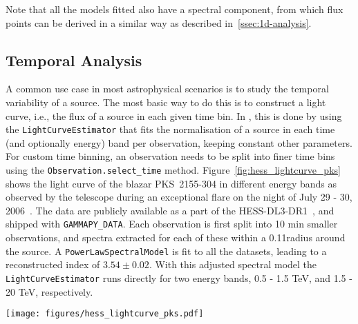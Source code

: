 \documentclass[traditabstract, longauth]{aa}
\newcommand{\todo}[1]{\textcolor{red}{TODO: #1}\PackageWarning{TODO:}{#1!}}
\newcommand{\code}[1]{\texttt{#1}}
\begin{document}
Note that all the models fitted also have a spectral component, from which flux
points can be derived in a similar way as described in~\ref{ssec:1d-analysis}.

\subsection{Temporal Analysis}
\label{ssec:temporal-analysis}
A common use case in most astrophysical scenarios is to study the temporal
variability of a source. The most basic way to do this is to construct a
light curve, i.e., the flux of a source in each given time bin. In \gammapy, this
is done by using the \code{LightCurveEstimator} that fits the normalisation of a
source in each time (and optionally energy) band per observation, keeping constant
other parameters.
For custom time binning, an observation needs to be split into finer time bins using
the \code{Observation.select\_time} method. Figure~\ref{fig:hess_lightcurve_pks}
shows the light curve of the blazar PKS~2155-304 in different energy bands as
observed by the \hess telescope during an exceptional flare on the night of
July 29 - 30, 2006~\cite{2009A&A...502..749A}. The data are publicly available 
as a part of the HESS-DL3-DR1~\cite{HESS-DL3-DR1}, and shipped with
\verb"GAMMAPY_DATA". Each observation is first split into 10 min smaller
observations, and spectra extracted for each of these within a 0.11\textdegree radius
around the source. A \code{PowerLawSpectralModel} is fit to all the datasets, leading
to a reconstructed index of $3.54 \pm 0.02$. With this adjusted spectral model
the \code{LightCurveEstimator} runs directly for two energy bands, 0.5 - 1.5
TeV, and 1.5 - 20 TeV, respectively.
%
\begin{figure*}[t]
    \sidecaption
	\texttt{[image: figures/hess\_lightcurve\_pks.pdf]}
	\caption{
        Binned light curves in two different energy bands for the source
        PKS~2155-304 in two energy bands, (500 GeV - 1.5 TeV, and 1.5 TeV to 20 TeV)
        as observed by the \hess telescopes in 2006. The coloured markers
        show the flux points in the different energy bands. The horizontal
        error illustrates the width of the time bin of 10~min. The vertical
        error bars show the associated assymetrical flux errors. The marker
        is set to the center of the time bin.
    }
    \label{fig:hess_lightcurve_pks}
\end{figure*}
\end{document}
